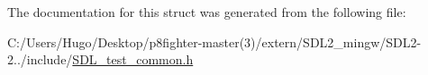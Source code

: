 The documentation for this struct was generated from the following file\+:\begin{DoxyCompactItemize}
\item 
C\+:/\+Users/\+Hugo/\+Desktop/p8fighter-\/master(3)/extern/\+S\+D\+L2\+\_\+mingw/\+S\+D\+L2-\/2../include/\hyperlink{_s_d_l__test__common_8h}{S\+D\+L\+\_\+test\+\_\+common.\+h}\end{DoxyCompactItemize}
